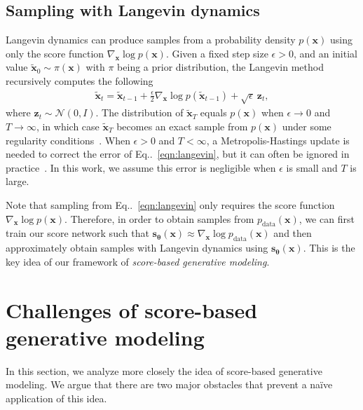 \documentclass{article}
\makeatletter
\newcommand{\mcal}{\mathcal}
\def\@onedot{\ifx\@let@token.\else.\null\fi\xspace}
\DeclareRobustCommand\onedot{\futurelet\@let@token\@onedot}
\newcommand{\eqnref}[1]{Eq\onedot~\eqref{#1}}
\newcommand{\bfx}{\mathbf{x}}
\newcommand{\bfz}{\mathbf{z}}
\newcommand{\bftheta}{{\boldsymbol{\theta}}}
\newcommand{\bfs}{\mathbf{s}}
\makeatother
\begin{document}
\subsection{Sampling with Langevin dynamics}
Langevin dynamics can produce samples from a probability density $p(\bfx)$ using only the score function $\nabla_\bfx \log p(\bfx)$. Given a fixed step size $\epsilon > 0$, and an initial value $\tilde{\bfx}_0 \sim \pi(\bfx)$ with $\pi$ being a prior distribution, the Langevin method recursively computes the following
\begin{align}
    \tilde{\bfx}_{t} = \tilde{\bfx}_{t-1} + \frac{\epsilon}{2}\nabla_\bfx \log p(\tilde{\bfx}_{t-1}) +  \sqrt{\epsilon}~ \bfz_t, \label{eqn:langevin}
\end{align}
where $\bfz_t \sim \mcal{N}(0, I)$. 
The distribution of $\tilde{\bfx}_T$ equals $p(\bfx)$ when $\epsilon \rightarrow 0$ and $T\rightarrow \infty$, in which case $\tilde{\bfx}_T$ becomes an exact sample from $p(\bfx)$ under some regularity conditions~\cite{welling2011bayesian}. When $\epsilon > 0$ and $T < \infty$, a Metropolis-Hastings update is needed to correct the error of \eqnref{eqn:langevin}, but 
it can often be ignored in practice~\cite{chen2014stochastic,du2019implicit,nijkamp2019anatomy}. 
In this work, we assume this error is negligible when $\epsilon$ is small and $T$ is large.

Note that sampling from \eqnref{eqn:langevin} only requires the score function $\nabla_\bfx \log p(\bfx)$. Therefore, in order to obtain samples from $p_\text{data}(\bfx)$, we can first train our score network such that $\bfs_\bftheta(\bfx) \approx \nabla_\bfx \log p_\text{data}(\bfx)$ and then approximately obtain samples with Langevin dynamics using $\bfs_\bftheta(\bfx)$. This is the key idea of our framework of \emph{score-based generative modeling}.


 \section{Challenges of score-based generative modeling}\label{sec:challenges}
In this section, we analyze more closely the idea of score-based generative modeling. We argue that there are two major obstacles that prevent a na\"{i}ve application of this idea. 
\end{document}
